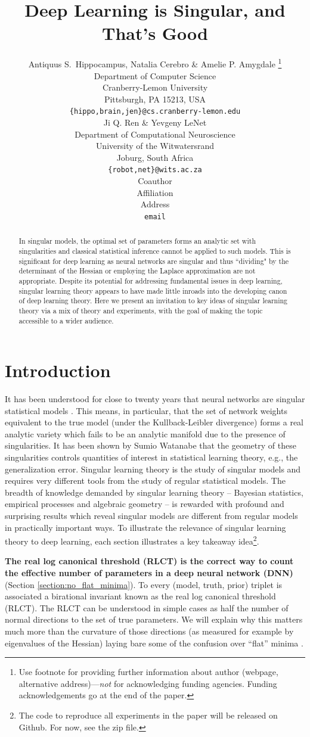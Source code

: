 \documentclass{article} %
\title{Deep Learning is Singular, and That's Good}
\author{Antiquus S.~Hippocampus, Natalia Cerebro \& Amelie P. Amygdale \thanks{ Use footnote for providing further information
about author (webpage, alternative address)---\emph{not} for acknowledging
funding agencies.  Funding acknowledgements go at the end of the paper.} \\
Department of Computer Science\\
Cranberry-Lemon University\\
Pittsburgh, PA 15213, USA \\
\texttt{\{hippo,brain,jen\}@cs.cranberry-lemon.edu} \\
\And
Ji Q. Ren \& Yevgeny LeNet \\
Department of Computational Neuroscience \\
University of the Witwatersrand \\
Joburg, South Africa \\
\texttt{\{robot,net\}@wits.ac.za} \\
\AND
Coauthor \\
Affiliation \\
Address \\
\texttt{email}
}
\begin{document}
\maketitle

\begin{abstract}
In singular models, the optimal set of parameters forms an analytic set with singularities and classical statistical inference cannot be applied to such models. This is significant for deep learning as neural networks are singular and thus ``dividing" by the determinant of the Hessian or employing the Laplace approximation are not appropriate. Despite its potential for addressing fundamental issues in deep learning, singular learning theory appears to have made little inroads into the developing canon of deep learning theory. Here we present an invitation to key ideas of singular learning theory via a mix of theory and experiments, with the goal of making the topic accessible to a wider audience. 
\end{abstract}

\section{Introduction}

It has been understood for close to twenty years that neural networks are singular statistical models \cite{amari_learning_2003, watanabe_almost_2007}. This means, in particular, that the set of network weights equivalent to the true model (under the Kullback-Leibler divergence) forms a real analytic variety which fails to be an analytic manifold due to the presence of singularities. It has been shown by Sumio Watanabe that the geometry of these singularities controls quantities of interest in statistical learning theory, e.g., the generalization error. Singular learning theory \citep{watanabe_algebraic_2009} is the study of singular models and requires very different tools from the study of regular statistical models. The breadth of knowledge demanded by singular learning theory -- Bayesian statistics, empirical processes and algebraic geometry -- is rewarded with profound and surprising results which reveal singular models are different from regular models in practically important ways.
To illustrate the relevance of singular learning theory to deep learning, each section illustrates a key takeaway idea\footnote{The code to reproduce all experiments in the paper will be released on Github. For now, see the zip file.}. 

\textbf{The real log canonical threshold (RLCT) is the correct way to count the effective number of parameters in a deep neural network (DNN)} (Section \ref{section:no_flat_minima}). 
    To every (model, truth, prior) triplet is associated a birational invariant known as the real log canonical threshold (RLCT). The RLCT can be understood in simple cases as half the number of normal directions to the set of true parameters. We will explain why this matters much more than the curvature of those directions (as measured for example by eigenvalues of the Hessian) laying bare some of the confusion over ``flat'' minima \citep{chaudhari2019entropy, smith2017bayesian, jastrzkebski2017three, zhang_energyentropy_2018}.
\end{document}

